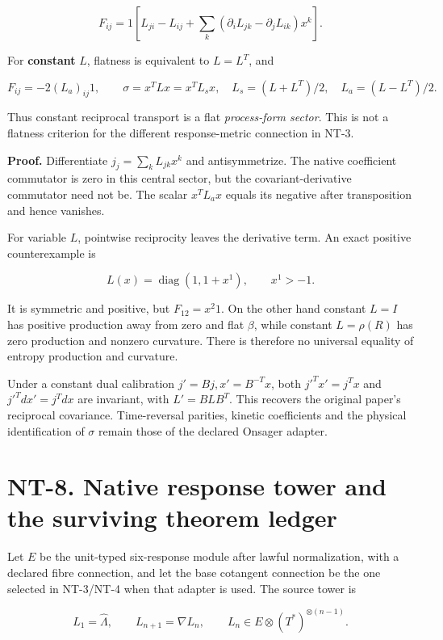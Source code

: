 \documentclass[
  11pt,
]{article}
\begin{document}
\[
F_{ij}=1\left[L_{ji}-L_{ij}
 +\sum_k(\partial_iL_{jk}-\partial_jL_{ik})x^k\right].
\]

For \textbf{constant} \(L\), flatness is equivalent to \(L=L^T\), and

\[
F_{ij}=-2(L_a)_{ij}1,\qquad
\sigma=x^TLx=x^TL_sx,
\quad L_s=(L+L^T)/2,\quad L_a=(L-L^T)/2.
\]

Thus constant reciprocal transport is a flat \emph{process-form sector}.
This is not a flatness criterion for the different response-metric
connection in NT-3.

\textbf{Proof.} Differentiate \(j_j=\sum_kL_{jk}x^k\) and
antisymmetrize. The native coefficient commutator is zero in this
central sector, but the covariant-derivative commutator need not be. The
scalar \(x^TL_ax\) equals its negative after transposition and hence
vanishes.

For variable \(L\), pointwise reciprocity leaves the derivative term. An
exact positive counterexample is

\[
L(x)=\operatorname{diag}(1,1+x^1),\qquad x^1>-1.
\]

It is symmetric and positive, but \(F_{12}=x^2 1\). On the other hand
constant \(L=I\) has positive production away from zero and flat
\(\beta\), while constant \(L=\rho(R)\) has zero production and nonzero
curvature. There is therefore no universal equality of entropy
production and curvature.

Under a constant dual calibration \(j'=Bj,x'=B^{-T}x\), both
\(j'^Tx'=j^Tx\) and \(j'^Tdx'=j^Tdx\) are invariant, with \(L'=BLB^T\).
This recovers the original paper's reciprocal covariance. Time-reversal
parities, kinetic coefficients and the physical identification of
\(\sigma\) remain those of the declared Onsager adapter.

\hypertarget{nt-8.-native-response-tower-and-the-surviving-theorem-ledger}{%
\section{NT-8. Native response tower and the surviving theorem
ledger}\label{nt-8.-native-response-tower-and-the-surviving-theorem-ledger}}

Let \(E\) be the unit-typed six-response module after lawful
normalization, with a declared fibre connection, and let the base
cotangent connection be the one selected in NT-3/NT-4 when that adapter
is used. The source tower is

\[
L_1=\widehat\Lambda,\qquad L_{n+1}=\nabla L_n,
\qquad L_n\in E\otimes(T^*)^{\otimes(n-1)}.
\]
\end{document}

